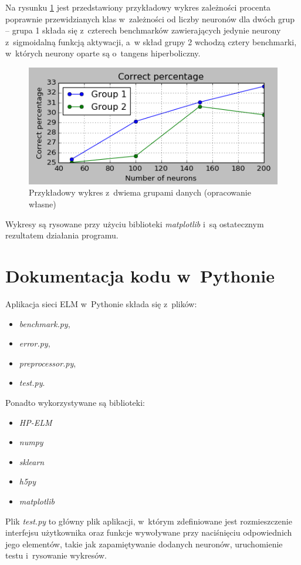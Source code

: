 \documentclass[pl]{minipw} %
\begin{document}
Na rysunku \ref{przykladowy} jest przedstawiony przykładowy wykres zależności procenta poprawnie przewidzianych klas w~zależności od liczby neuronów dla dwóch grup -- grupa 1 składa się z~czterech benchmarków zawierających jedynie neurony z~sigmoidalną funkcją aktywacji, a~w skład grupy 2 wchodzą cztery benchmarki, w~których neurony oparte są o~tangens hiperboliczny. 
 
\begin{figure}[H]
\includegraphics[width=\textwidth]{przykladowy_wykres.png}
\caption[Przykładowy wykres z~dwiema grupami danych]{Przykładowy wykres z~dwiema grupami danych (opracowanie własne)}
\label{przykladowy}
\end{figure}


Wykresy są rysowane przy użyciu biblioteki \textit{matplotlib} i~są ostatecznym rezultatem działania programu.

\section{Dokumentacja kodu w~Pythonie}
Aplikacja sieci ELM w~Pythonie składa się z~plików:
\label{python-dokumentacja}
\begin{itemize}
\item \textit{benchmark.py},
\item \textit{error.py}, 
\item \textit{preprocessor.py},
\item \textit{test.py}.
\end{itemize}
Ponadto wykorzystywane są biblioteki:
\begin{itemize}
\item \textit{HP-ELM}
\item \textit{numpy}
\item \textit{sklearn}
\item \textit{h5py}
\item \textit{matplotlib}
\end{itemize}
Plik \textit{test.py} to główny plik aplikacji, w~którym zdefiniowane jest rozmieszczenie interfejsu użytkownika oraz funkcje wywoływane przy naciśnięciu odpowiednich jego elementów, takie jak zapamiętywanie dodanych neuronów, uruchomienie testu i~rysowanie wykresów.
\end{document}
